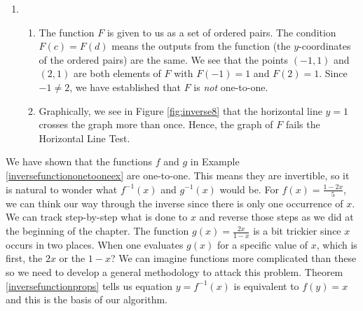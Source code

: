 {\begin{enumerate}
\begin{enumerate}
\end{enumerate}


\item  \begin{enumerate} \item The function $F$ is given to us as a set of ordered pairs.  The condition $F(c)=F(d)$ means the outputs from the function (the $y$-coordinates of the ordered pairs) are the same.  We see that the points $(-1,1)$ and $(2,1)$ are both elements of $F$ with $F(-1)=1$ and $F(2) = 1$.  Since $-1 \neq 2$, we have established that $F$ is \textit{not} one-to-one.

\item  Graphically, we see in Figure \ref{fig:inverse8} that the horizontal line $y=1$ crosses the graph more than once.  Hence, the graph of $F$ fails the Horizontal Line Test.

\end{enumerate}

\end{enumerate}

}

We have shown that the functions $f$ and $g$ in Example \ref{inversefunctiononetooneex} are one-to-one.  This means they are invertible, so it is natural to wonder what $f^{-1}(x)$ and $g^{-1}(x)$ would be.  For $f(x) =  \frac{1-2x}{5}$, we can think our way through the inverse since there is only one occurrence of $x$. We can track step-by-step what is done to $x$ and reverse those steps as we did at the beginning of the chapter.  The function $g(x) = \frac{2x}{1-x}$ is a bit trickier since $x$ occurs in two places.  When one evaluates $g(x)$ for a specific value of $x$, which is first, the $2x$ or the $1-x$?  We can imagine functions more complicated than these so we need to develop a general methodology to attack this problem.  Theorem \ref{inversefunctionprops} tells us equation $y = f^{-1}(x)$ is equivalent to $f(y) = x$ and this is the basis of our algorithm.

\smallskip


